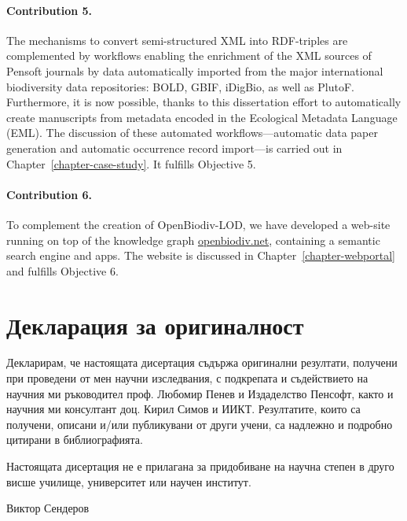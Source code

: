\paragraph{Contribution 5.} The mechanisms to convert semi-structured XML into RDF-triples are complemented by workflows enabling the enrichment of the XML sources of Pensoft journals by data automatically imported from the major international biodiversity data repositories: BOLD, GBIF, iDigBio, as well as PlutoF. Furthermore, it is now possible, thanks to this dissertation effort to automatically create manuscripts from metadata encoded in the Ecological Metadata Language (EML). The discussion of these automated workflows---automatic data paper generation and automatic occurrence record import---is carried out in Chapter~\ref{chapter-case-study}. It fulfills Objective 5.

\paragraph{Contribution 6.} To complement the creation of OpenBiodiv-LOD, we have developed a web-site running on top of the knowledge graph \href{http://openbiodiv.net}{openbiodiv.net}, containing a semantic search engine and apps. The website is discussed in Chapter~\ref{chapter-webportal} and fulfills Objective 6.

\section*{Декларация за оригиналност}

Декларирам, че настоящата дисертация съдържа оригинални резултати, получени 
при проведени от мен научни изследвания, с подкрепата и съдействието на научния ми ръководител проф. Любомир Пенев и Издаделство Пенсофт, както и научния ми консултант доц. Кирил Симов и ИИКТ.  Резултатите,  които  са  получени,  описани  и/или  публикувани  от  други учени, са надлежно и подробно цитирани в библиографията.

Настоящата дисертация не е прилагана за придобиване на научна степен в друго 
висше училище, университет или научен институт.

Виктор Сендеров


